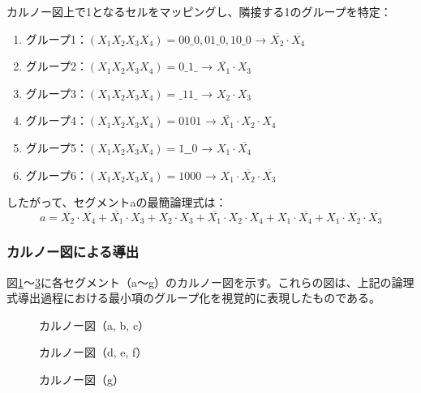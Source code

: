 \documentclass[a4j,dvipdfmx]{jsarticle}
\begin{document}
カルノー図上で1となるセルをマッピングし、隣接する1のグループを特定：

\begin{enumerate}
\item グループ1：$(X_1X_2X_3X_4) = 00\_0, 01\_0, 10\_0$ → $\overline{X_2} \cdot \overline{X_4}$
\item グループ2：$(X_1X_2X_3X_4) = 0\_1\_$ → $\overline{X_1} \cdot X_3$
\item グループ3：$(X_1X_2X_3X_4) = \_11\_$ → $X_2 \cdot X_3$
\item グループ4：$(X_1X_2X_3X_4) = 0101$ → $\overline{X_1} \cdot X_2 \cdot X_4$
\item グループ5：$(X_1X_2X_3X_4) = 1\_\_0$ → $X_1 \cdot \overline{X_4}$
\item グループ6：$(X_1X_2X_3X_4) = 1000$ → $X_1 \cdot \overline{X_2} \cdot \overline{X_3}$
\end{enumerate}

したがって、セグメントaの最簡論理式は：
$$a = \overline{X_2} \cdot \overline{X_4} + \overline{X_1} \cdot X_3 + X_2 \cdot X_3 + \overline{X_1} \cdot X_2 \cdot X_4 + X_1 \cdot \overline{X_4} + X_1 \cdot \overline{X_2} \cdot \overline{X_3}$$

\subsubsection{カルノー図による導出}

図\ref{fig:karnaugh_maps_abc}〜\ref{fig:karnaugh_maps_g}に各セグメント（a〜g）のカルノー図を示す。これらの図は、上記の論理式導出過程における最小項のグループ化を視覚的に表現したものである。

\begin{figure}[H]
\centering
{}
\caption{カルノー図（a, b, c）}
\label{fig:karnaugh_maps_abc}
\end{figure}

\begin{figure}[H]
\centering
{}
\caption{カルノー図（d, e, f）}
\label{fig:karnaugh_maps_def}
\end{figure}

\begin{figure}[H]
\centering
{}
\caption{カルノー図（g）}
\label{fig:karnaugh_maps_g}
\end{figure}
\end{document}
